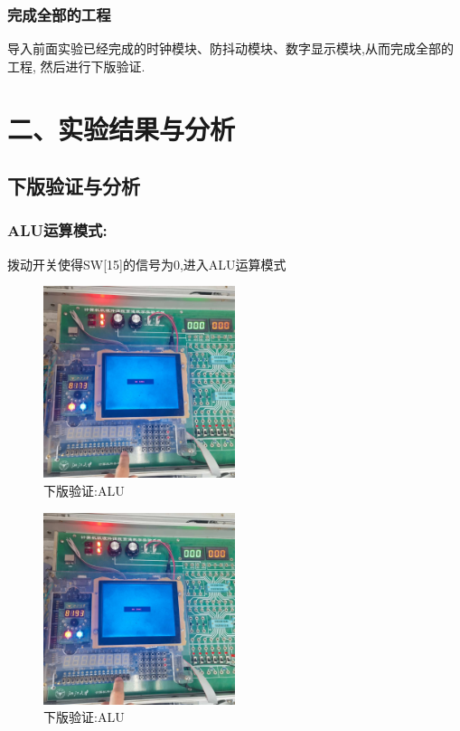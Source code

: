 \documentclass{article}
\begin{document}
\subsubsection*{完成全部的工程}
导入前面实验已经完成的时钟模块、防抖动模块、数字显示模块,从而完成全部的工程,
然后进行下版验证.

\section*{二、实验结果与分析}
\subsection*{下版验证与分析}

\subsubsection*{ALU运算模式:}
拨动开关使得SW[15]的信号为0,进入ALU运算模式
    \begin{figure}[H]
    \centering
    \includegraphics[width=0.5\textwidth]{3.jpg}
    \caption{\label{Lab11}下版验证:ALU}
    \end{figure}

    \begin{figure}[H]
    \centering
    \includegraphics[width=0.5\textwidth]{4.jpg}
    \caption{\label{Lab11}下版验证:ALU}
    \end{figure}
\end{document}
